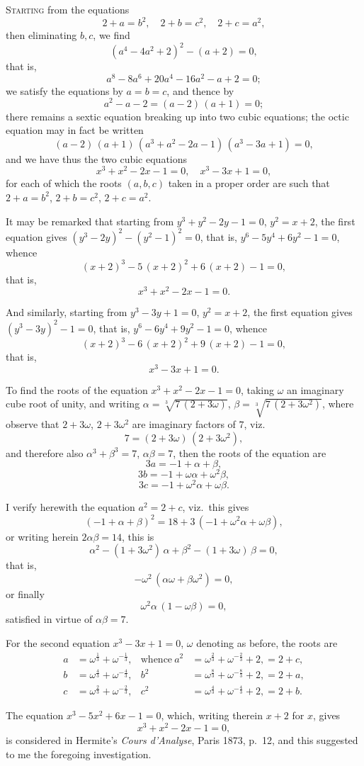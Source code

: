 \documentclass[11pt]{article}
\begin{document}
\textsc{Starting} from the equations
\[
2 + a = b^2,\quad 2 + b = c^2,\quad 2 + c = a^2,
\]
then eliminating $b, c$, we find
\[
(a^4 - 4 a^2 + 2)^2 - (a + 2) = 0,
\]
that is,
\[
a^8 - 8 a^6 + 20 a^4 - 16 a^2 - a + 2 = 0;
\]
we satisfy the equations by $a = b = c$, and thence by
\[
a^2 - a - 2 = (a - 2)\,(a + 1) = 0;
\]
there remains a sextic equation breaking up into two cubic equations; the octic equation may in fact be written
\[
(a - 2)\,(a + 1)\,(a^3 + a^2 - 2 a - 1)\,(a^3 - 3 a + 1) = 0,
\]
and we have thus the two cubic equations
\[
x^3 + x^2 - 2 x - 1 = 0,\quad x^3 - 3 x + 1 = 0,
\]
for each of which the roots $(a, b, c)$ taken in a proper order are such that $2 + a = b^2$, $2 + b = c^2$, $2 + c = a^2$.

It may be remarked that starting from $y^3 + y^2 - 2 y - 1 = 0$, $y^2 = x + 2$, the first equation gives $(y^3 - 2 y)^2 - (y^2 - 1)^2 = 0$, that is, $y^6 - 5 y^4 + 6 y^2 - 1 = 0$, whence
\[
(x + 2)^3 - 5\,(x + 2)^2 + 6\,(x + 2) - 1 = 0,
\]
that is,
\[
x^3 + x^2 - 2 x - 1 = 0.
\]

And similarly, starting from $y^3 - 3 y + 1 = 0$, $y^2 = x + 2$, the first equation gives $(y^3 - 3 y)^2 - 1 = 0$, that is, $y^6 - 6 y^4 + 9 y^2 - 1 = 0$, whence
\[
(x + 2)^3 - 6\,(x + 2)^2 + 9\,(x + 2) - 1 = 0,
\]
that is,
\[
x^3 - 3 x + 1 = 0.
\]

To find the roots of the equation $x^3 + x^2 - 2 x - 1 = 0$, taking $\omega$ an imaginary cube root of unity, and writing $\alpha = \sqrt[3]{7\,(2 + 3\omega)}$, $\beta = \sqrt[3]{7\,(2 + 3\omega^2)}$, where observe that $2 + 3\omega$, $2 + 3\omega^2$ are imaginary factors of $7$, viz.
\[
7 = (2 + 3\omega)\,(2 + 3\omega^2),
\]
and therefore also $\alpha^3 + \beta^3 = 7$, $\alpha\beta = 7$, then the roots of the equation are
\[
3 a = -1 + \alpha + \beta,
\]
\[
3 b = -1 + \omega\alpha + \omega^2 \beta,
\]
\[
3 c = -1 + \omega^2\alpha + \omega\beta.
\]

I verify herewith the equation $a^2 = 2 + c$, viz.\ this gives
\[
(-1 + \alpha + \beta)^2 = 18 + 3\,(-1 + \omega^2\alpha + \omega\beta),
\]
or writing herein $2\alpha\beta = 14$, this is
\[
\alpha^2 - (1 + 3\omega^2)\,\alpha + \beta^2 - (1 + 3\omega)\,\beta = 0,
\]
that is,
\[
-\omega^2\,(\alpha\omega + \beta\omega^2) = 0,
\]
or finally
\[
\omega^2\alpha\,(1 - \omega\beta) = 0,
\]
satisfied in virtue of $\alpha\beta = 7$.

For the second equation $x^3 - 3 x + 1 = 0$, $\omega$ denoting as before, the roots are
\begin{align*}
a &= \omega^{\tfrac{1}{3}} + \omega^{-\tfrac{1}{3}}, & \text{whence}\ a^2 &= \omega^{\tfrac{2}{3}} + \omega^{-\tfrac{2}{3}} + 2, = 2 + c, \\
b &= \omega^{\tfrac{4}{3}} + \omega^{-\tfrac{4}{3}}, & b^2 &= \omega^{\tfrac{8}{3}} + \omega^{-\tfrac{8}{3}} + 2, = 2 + a, \\
c &= \omega^{\tfrac{2}{3}} + \omega^{-\tfrac{2}{3}}, & c^2 &= \omega^{\tfrac{4}{3}} + \omega^{-\tfrac{4}{3}} + 2, = 2 + b.
\end{align*}

The equation $x^3 - 5 x^2 + 6 x - 1 = 0$, which, writing therein $x + 2$ for $x$, gives
\[
x^3 + x^2 - 2 x - 1 = 0,
\]
is considered in Hermite's \textit{Cours d'Analyse}, Paris 1873, p.\ 12, and this suggested to me the foregoing investigation.
\end{document}
